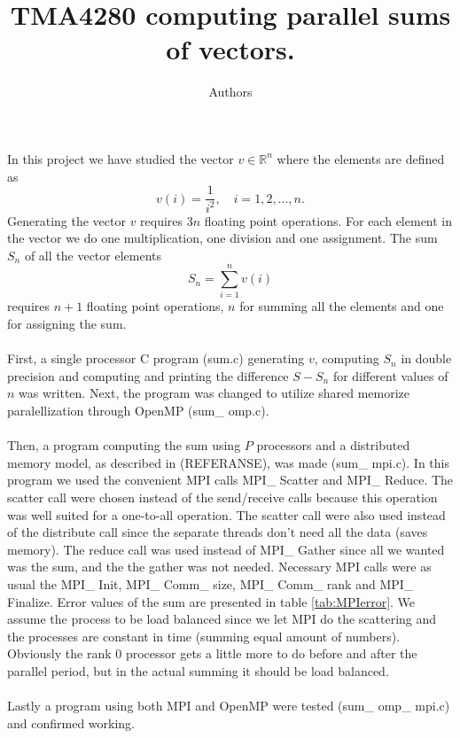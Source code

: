 \documentclass{article}
\title{TMA4280 computing parallel sums of vectors.}
\author{Authors}
\begin{document}
\maketitle
In this project we have studied the vector $v \in \mathbb{R}^n$ where the elements are defined as 
\begin{equation}
\label{vdefinition}
	v(i) =\frac{1}{i^2},\quad i = 1,2,...,n.
\end{equation}
Generating the vector $v$ requires $3n$ floating point operations. For each element in the vector we do one multiplication, one division and one assignment.  
The sum $S_n$ of all the vector elements 
\begin{equation}
\label{Sdefinition}
	S_n = \sum_{i=1}^n v(i)
\end{equation}
requires $n+1$ floating point operations, $n$ for summing all the elements and one for assigning the sum.\\
\\
First, a single processor C program (sum.c) generating $v$, computing $S_n$ in double precision and computing and printing the difference $S - S_n$ for different values of $n$ was written. Next, the program was changed to utilize shared memorize paralellization through OpenMP (sum\_ omp.c). \\
\\
Then, a program computing the sum using $P$ processors and a distributed memory model, as described in (REFERANSE), was made (sum\_ mpi.c). In this program we used the convenient MPI calls MPI\_ Scatter and MPI\_ Reduce. The scatter call were chosen instead of the send/receive calls because this operation was well suited for a one-to-all operation. The scatter call were also used instead of the distribute call since the separate threads don't need all the data (saves memory). The reduce call was used instead of MPI\_ Gather since all we wanted was the sum, and the the gather was not needed. Necessary MPI calls were as usual the MPI\_ Init, MPI\_ Comm\_ size, MPI\_ Comm\_ rank and MPI\_ Finalize. Error values of the sum are presented in table \ref{tab:MPIerror}. We assume the process to be load balanced since we let MPI do the scattering and the processes are constant in time (summing equal amount of numbers). Obviously the rank 0 processor gets a little more to do before and after the parallel period, but in the actual summing it should be load balanced. \\
\\
Lastly a program using both MPI and OpenMP were tested (sum\_ omp\_ mpi.c) and confirmed working.
\end{document}

